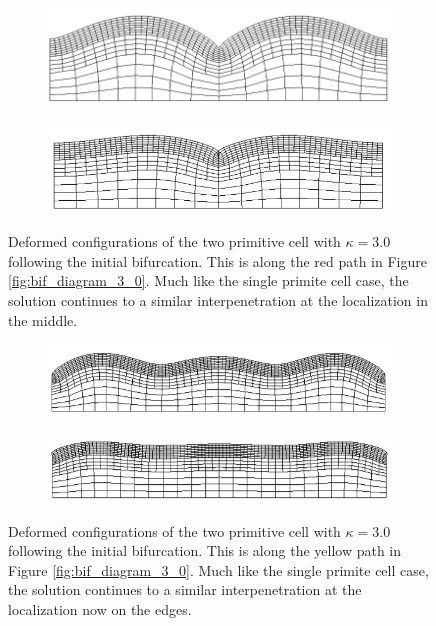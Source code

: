 \documentclass[11pt]{report}
\begin{document}
\begin{figure}[!htb]
	\begin{subfigure}[b]{0.5\textwidth}
		\includegraphics[width=\textwidth]{mesh/mesh_3_0_2_low}
	\end{subfigure}
    \begin{subfigure}[b]{0.5\textwidth}
		\includegraphics[width=\textwidth]{mesh/mesh_3_0_2_high}
	\end{subfigure}
	\captionsetup{format=hang}
	\caption{Deformed configurations of the two primitive cell with $\kappa = 3.0$ following the initial bifurcation. This is along the red path in Figure \ref{fig:bif_diagram_3_0}. Much like the single primite cell case, the solution continues to a similar interpenetration at the localization in the middle.}
    \label{fig:mesh_3_0_2}
\end{figure}

\begin{figure}[!htb]
	\begin{subfigure}[b]{0.5\textwidth}
		\includegraphics[width=\textwidth]{mesh/mesh_3_0_3_low}
	\end{subfigure}
    \begin{subfigure}[b]{0.5\textwidth}
		\includegraphics[width=\textwidth]{mesh/mesh_3_0_3_high}
	\end{subfigure}
	\captionsetup{format=hang}
	\caption{Deformed configurations of the two primitive cell with $\kappa = 3.0$ following the initial bifurcation. This is along the yellow path in Figure \ref{fig:bif_diagram_3_0}. Much like the single primite cell case, the solution continues to a similar interpenetration at the localization now on the edges.}
    \label{fig:mesh_3_0_3}
\end{figure}
\end{document}

